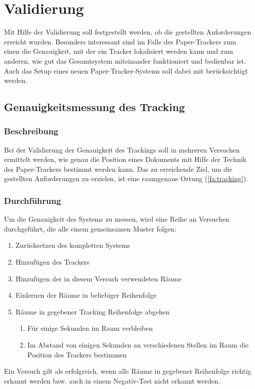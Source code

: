 \chapter{Validierung}
Mit Hilfe der Validierung soll festgestellt werden, ob die gestellten Anforderungen erreicht wurden.
Besonders interessant sind im Falle des Paper-Trackers zum einen die Genauigkeit, mit der ein Tracker lokalisiert werden
kann und zum anderen, wie gut das Gesamtsystem miteinander funktioniert und bedienbar ist.
Auch das Setup eines neuen Paper-Tracker-Systems soll dabei mit berücksichtigt werden.

\section{Genauigkeitsmessung des Tracking}
\subsection{Beschreibung}
Bei der Validierung der Genauigkeit des Trackings soll in mehreren Versuchen ermittelt werden, wie genau die Position
eines Dokuments mit Hilfe der Technik des Paper-Trackers bestimmt werden kann.
Das zu erreichende Ziel, um die gestellten Anforderungen zu erzielen, ist eine raumgenaue Ortung (\ref*{fa:tracking}).

\subsection{Durchführung}
Um die Genauigkeit des Systems zu messen, wird eine Reihe an Versuchen durchgeführt, die alle einem gemeinsamen Muster folgen:
\begin{enumerate}
	\item Zurücksetzen des kompletten Systems
	\item Hinzufügen des Trackers
	\item Hinzufügen der in diesem Versuch verwendeten Räume
	\item Einlernen der Räume in beliebiger Reihenfolge
	\item Räume in gegebener Tracking Reihenfolge abgehen
	\begin{enumerate}
		\item Für einige Sekunden im Raum verbleiben
		\item Im Abstand von einigen Sekunden an verschiedenen Stellen im Raum die Position des Trackers bestimmen
	\end{enumerate}
\end{enumerate}
Ein Versuch gilt als erfolgreich, wenn alle Räume in gegebener Reihenfolge richtig erkannt werden bzw. auch in einem
Negativ-Test nicht erkannt werden.

